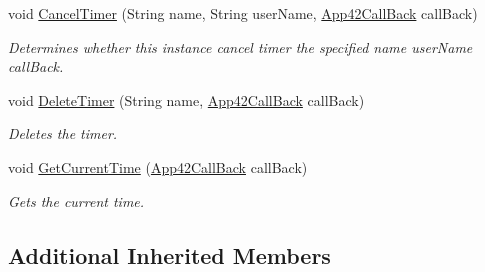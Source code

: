 \begin{DoxyCompactItemize}
void \hyperlink{classcom_1_1shephertz_1_1app42_1_1paas_1_1sdk_1_1csharp_1_1timer_1_1_timer_service_a82883e1e6068ba825f6c66c087c2ab0c}{Cancel\+Timer} (String name, String user\+Name, \hyperlink{interfacecom_1_1shephertz_1_1app42_1_1paas_1_1sdk_1_1csharp_1_1_app42_call_back}{App42\+Call\+Back} call\+Back)
\begin{DoxyCompactList}\small\item\em Determines whether this instance cancel timer the specified name user\+Name call\+Back. \end{DoxyCompactList}\item 
void \hyperlink{classcom_1_1shephertz_1_1app42_1_1paas_1_1sdk_1_1csharp_1_1timer_1_1_timer_service_a26ca2155d38405c81c77463c794c15e7}{Delete\+Timer} (String name, \hyperlink{interfacecom_1_1shephertz_1_1app42_1_1paas_1_1sdk_1_1csharp_1_1_app42_call_back}{App42\+Call\+Back} call\+Back)
\begin{DoxyCompactList}\small\item\em Deletes the timer. \end{DoxyCompactList}\item 
void \hyperlink{classcom_1_1shephertz_1_1app42_1_1paas_1_1sdk_1_1csharp_1_1timer_1_1_timer_service_aa0ef98b0fc4b126c0f823d17310f75ea}{Get\+Current\+Time} (\hyperlink{interfacecom_1_1shephertz_1_1app42_1_1paas_1_1sdk_1_1csharp_1_1_app42_call_back}{App42\+Call\+Back} call\+Back)
\begin{DoxyCompactList}\small\item\em Gets the current time. \end{DoxyCompactList}\end{DoxyCompactItemize}
\subsection*{Additional Inherited Members}


